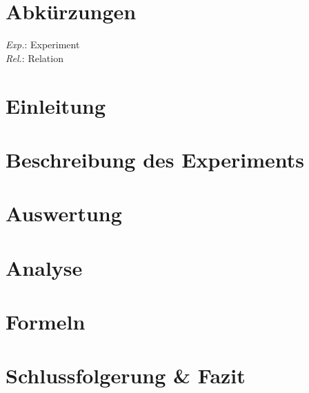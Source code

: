 \documentclass[12pt,twoside,a4paper,titlepage]{article}
\title{\titleText}
\author{\authorText}
\date{\dateText}
\begin{document}
	\maketitle
	\tableofcontents

	\section*{Abkürzungen}
	
	\begin{multicols}{3}
		\textit{Exp.}: Experiment\\
		\textit{Rel.}: Relation \\
	\end{multicols}
	
	\clearpage

    \section{Einleitung}
    
   	
    
    \section{Beschreibung des Experiments}

	
    
    \section{Auswertung}

	
    
    \section{Analyse}

	

    \section{Formeln}
	
	
    
    \section{Schlussfolgerung \& Fazit}
    
    
    
    
    
    
\end{document}
